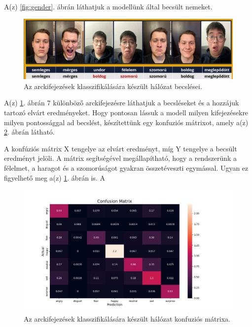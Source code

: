 \documentclass[12pt,a4]{article}
\begin{document}
                A(z) \ref{fig:gender}. ábrán láthatjuk a modellünk által becsült nemeket.
            
                \begin{figure}[h!]	
            		\centering
            		\includegraphics[width=1\linewidth]{arcanalizis}
                    \caption{  Az arckifejezések klasszifikálására készült hálózat becslései.}
                    \label{fig:expr}
            	\end{figure}
            
                A(z) \ref{fig:expr}. ábrán 7 különböző arckifejezésre láthatjuk a becsléseket és a hozzájuk tartozó elvárt eredményeket. Hogy pontosan lássuk a modell milyen kifejezésekre milyen pontossággal ad becslést, készítettünk egy konfuziós mátrixot, amely a(z) \ref{fig:cfmatrix}. ábrán látható.

                A konfúziós mátrix X tengelye az elvárt eredményt, míg Y tengelye a becsült eredményt jelöli.
                A mátrix segítségével megállapítható, hogy a rendszerünk a félelmet, a haragot és a szomorúságot gyakran összetéveszti egymással. Ugyan ez figyelhető meg a(z) \ref{fig:expr}. ábrán is. A 
                
            
                \begin{figure}[h!]	
            		\centering
            		\includegraphics[width=1\linewidth]{cf_matrix_normalized.png}
                    \caption{Az arckifejezések klasszifikálására készült hálózat konfuziós mátrixa.}
                    \label{fig:cfmatrix}
            	\end{figure}
\end{document}
